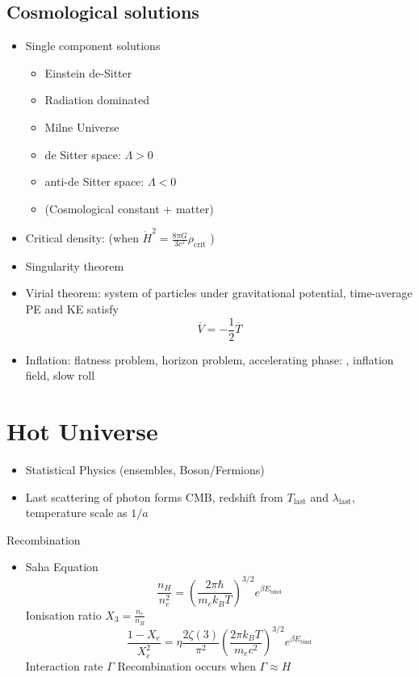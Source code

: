 \subsection*{Cosmological solutions}
\begin{itemize}
    \item Single component solutions
    \begin{itemize}
        \item Einstein de-Sitter
        \item Radiation dominated
        \item Milne Universe
        \item de Sitter space: $\Lambda > 0$
        \item anti-de Sitter space: $\Lambda < 0$
        \item (Cosmological constant + matter)
    \end{itemize}
    \item Critical density: (when $\dot{H}^2 =\frac{8\pi G}{3c^2}\rho_\text{crit}$ )
    \item Singularity theorem
    \item Virial theorem: system of particles under gravitational potential, time-average PE and KE satisfy
    \[\overline{V} = -\frac12 \overline{T}\]
    \item Inflation: flatness problem, horizon problem, accelerating phase: , inflation field, slow roll
\end{itemize}
\section{Hot Universe}
\begin{itemize}
    \item Statistical Physics (ensembles, Boson/Fermions)
    \item Last scattering of photon forms CMB, redshift from $T_\text{last}$ and $\lambda_\text{last}$, temperature scale as $1/a$
\end{itemize} 
Recombination
\begin{itemize}
    \item Saha Equation
    \[\frac{n_H}{n_e^2} = \left(\frac{2\pi\hbar}{m_ek_BT}\right)^{3/2}e^{\beta E_\text{bind}}\]
    Ionisation ratio $X_3 = \frac{n_e}{n_B}$ 
    \[\frac{1-X_e}{X_e^2} = \eta \frac{2\zeta(3)}{\pi^2} \left(\frac{2\pi k_BT}{m_e c^2}\right)^{3/2}e^{\beta E_\text{bind}}\]
    Interaction rate $\Gamma$
    Recombination occurs when $\Gamma\approx H$
\end{itemize}

